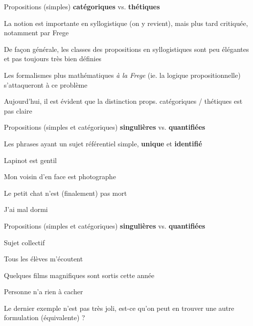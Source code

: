 \begin{frame}
	Propositions (simples) \textbf{catégoriques} vs. \textbf{thétiques} \newline
	
La notion est importante en syllogistique (on y revient), mais plus tard critiquée, notamment par Frege \pause \newline

De façon générale, les classes des propositions en syllogistiques sont peu élégantes et pas toujours très bien définies\pause \newline

Les formalismes plus mathématiques \textit{à la Frege} (ie. la logique propositionnelle) s'attaqueront à ce problème\pause \newline

Aujourd'hui, il est évident que la distinction props. catégoriques / thétiques est pas claire

\end{frame}



\begin{frame}
	Propositions (simples et catégoriques) \textbf{singulières} vs. \textbf{quantifiées}\newline
	
		\begin{description}[labelindent=6pt,style=multiline,leftmargin=1.3in]
		 \setlength\itemsep{1em}
\item[Singulières] Les phrases ayant un sujet référentiel simple, \textbf{unique} et \textbf{identifié}\pause
\item[Exemple] Lapinot est gentil \pause
\item[] Mon voisin d'en face est photographe \pause
\item[] Le petit chat n'est (finalement) pas mort \pause
\item[] J'ai mal dormi
	\end{description}
\end{frame}

\begin{frame}
	Propositions (simples et catégoriques) \textbf{singulières} vs. \textbf{quantifiées}\newline
	
		\begin{description}[labelindent=6pt,style=multiline,leftmargin=1.3in]
		 \setlength\itemsep{1em}
\item[Quantifiées] Sujet collectif \pause
\item[Exemple] Tous les élèves m'écoutent \pause
\item[] Quelques films magnifiques sont sortis cette année \pause
\item[] Personne n'a rien à cacher\pause
\item[Question] Le dernier exemple n'est pas très joli, est-ce qu'on peut en trouver une autre formulation (équivalente) ?
	\end{description}
\end{frame}


